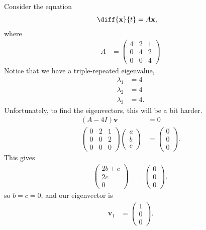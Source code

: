 \documentclass[10pt]{mypackage}
\begin{document}
\begin{example}
  Consider the equation
  \begin{align*}
    \diff{\mathbf{x}}{t} &= A\mathbf{x},
  \end{align*}
  where
  \begin{align*}
    A &= \begin{pmatrix}4 & 2 & 1 \\ 0 & 4 & 2 \\ 0 & 0 & 4\end{pmatrix} \label{eq:generalized_eigenvalues_example}\tag{$A$}
  \end{align*}
  Notice that we have a triple-repeated eigenvalue,
  \begin{align*}
    \lambda_1 &= 4\\
    \lambda_2 &= 4\\
    \lambda_3 &= 4.
  \end{align*}
  Unfortunately, to find the eigenvectors, this will be a bit harder.
  \begin{align*}
    \left( A - 4I \right)\mathbf{v} &= 0\\
    \begin{pmatrix}0 & 2 & 1 \\ 0 & 0 & 2 \\ 0 & 0 & 0\end{pmatrix} \begin{pmatrix}a\\b\\c\end{pmatrix} &= \begin{pmatrix}0\\0\\0\end{pmatrix}.
  \end{align*}
  This gives
  \begin{align*}
    \begin{pmatrix}2b + c \\ 2c \\ 0 \end{pmatrix} &= \begin{pmatrix}0\\0\\0\end{pmatrix},
  \end{align*}
  so $b = c = 0$, and our eigenvector is
  \begin{align*}
    \mathbf{v}_1 &= \begin{pmatrix}1\\0\\0\end{pmatrix}.

\end{align*}
\end{example}
\end{document}
